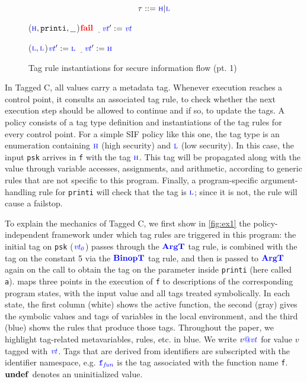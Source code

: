 \documentclass{llncs}
\begin{document}
\begin{figure}[t]
  \begin{minipage}{0.25\textwidth}
    \center
    \[\tau::=\high | \low\]
  \end{minipage}
  \begin{minipage}{0.45\textwidth}
    \center
    \argtexruleblock
        {\caseoftwo{\((\vt,\FN,\AN)\)}
          {(\(\high,\mathtt{printi},\underline{~~}\))}{\(\fail\)}
          {\(\underline{~~~}\)}{\(\vt':=\vt\)}}
  \end{minipage}
  \begin{minipage}{0.27\textwidth}
    \center
    \binoptexruleblock
        {\caseoftwo{\((\vt[_1],\vt[_2])\)}
          {(\(\low,\low\))}{\(\vt':=\low\)}
          {\(\underline{~~~}\)}{\(\vt':=\high\)}}
  \end{minipage}

  \caption{Tag rule instantiations for secure information flow (pt. 1)}
  \label{fig:example1rules}
\end{figure}

In Tagged C, all values carry a metadata tag. Whenever execution reaches a control point, it consults
an associated tag rule, to check whether the next execution step should be allowed to continue and
if so, to update the tags. A policy consists of a tag type definition and instantiations of the tag
rules for every control point. For a simple SIF policy like this one, the tag type is an enumeration
containing \(\high\) (high security) and \(\low\) (low security).
In this case, the input {\tt psk} arrives in {\tt f} with the tag \(\high\).
This tag will be propagated along with the value through variable accesses,
assignments, and arithmetic, according to generic rules that are not specific to this program.
Finally, a program-specific argument-handling rule for {\tt printi} will check that the tag is
\(\low\); since it is not, the rule will cause a failstop.

To explain the mechanics of Tagged C, we first show in \cref{fig:ex1} the policy-independent
framework under which tag rules are triggered in this program: the initial tag on {\tt psk} (\(\vt[_0]\))
passes through the \(\argtname\) tag rule, is combined with the tag on the constant 5 via
the \(\binoptname\) tag rule, and then is passed to \(\argtname\) again on the call
to obtain the tag on the parameter inside {\tt printi} (here called {\tt a}).
 maps three points in the execution of {\tt f} to descriptions of the
corresponding program states, with the input value and all tags treated symbolically.
In each state, the first column (white) shows the active function, the second (gray) gives
the symbolic values and tags of variables in the local environment, and the third (blue)
shows the rules that produce those tags.
Throughout the paper, we highlight tag-related metavariables, rules, etc. in {\color{blue}blue}.
We write \(v\tagat \vt\) for value \(v\) tagged with \(\vt\).
Tags that are derived from identifiers are subscripted with the identifier namespace, e.g.
\(\FN[f]\) is the tag associated with the function name {\tt f}.  
\(\vundef\) denotes an uninitialized value.
\end{document}
